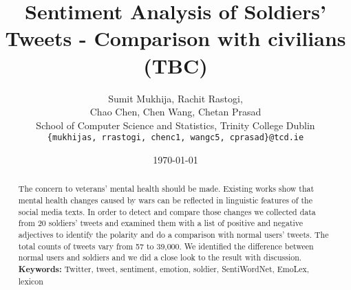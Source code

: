 \documentclass[english,a4paper,11pt]{article}
\title{Sentiment Analysis of Soldiers' Tweets - Comparison with civilians (TBC)}
\date{\today}
\author{
  Sumit Mukhija, Rachit Rastogi,\\
  Chao Chen, Chen Wang, Chetan Prasad\\
  School of Computer Science and Statistics, Trinity College Dublin\\
  \texttt{\{mukhijas, rrastogi, chenc1, wangc5, cprasad\}@tcd.ie}
}
\begin{document}
\maketitle
\thispagestyle{empty}
\pagestyle{empty}

\begin{abstract}
  The concern to veterans' mental health should be made. Existing works show that
  mental health changes caused by wars can be reflected in linguistic features of
  the social media texts. In order to detect and compare those changes we collected
  data from 20 soldiers' tweets and examined them with a list of positive and negative
  adjectives to identify the polarity and do a comparison with normal users'
  tweets. The total counts of tweets vary from 57 to 39,000. We identified the
  difference between normal users and soldiers and we did a close look to the
  result with discussion. \\
  \textbf{Keywords:} Twitter, tweet, sentiment, emotion, soldier, SentiWordNet, EmoLex, lexicon
\end{abstract}








\clearpage



\end{document}

